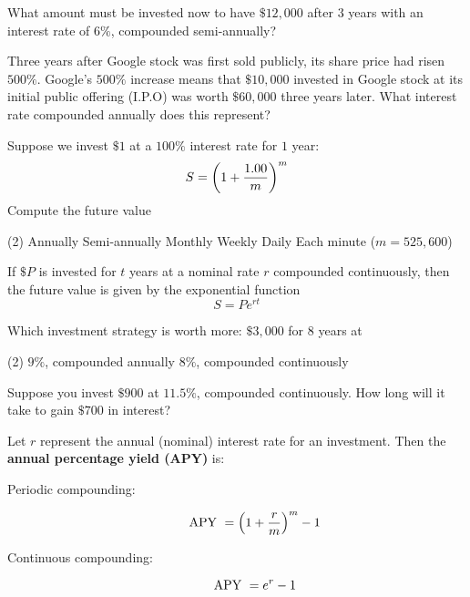 \documentclass[../mathNotesPreamble]{subfiles}
\begin{document}
  \begin{ex*}
    What amount must be invested now to have $\$12,000$ after $3$ years with an interest rate of $6\%$, compounded semi-annually?
  \end{ex*}
  
  \begin{ex*}
    Three years after Google stock was first sold publicly, its share price had risen $500\%$. Google’s $500\%$ increase means that $\$10,000$ invested in Google stock at its initial public offering (I.P.O) was worth $\$60,000$ three years later. What interest rate compounded annually does this represent?
  \end{ex*}
  \pagebreak
  
  \begin{ex*}
    Suppose we invest $\$1$ at a $100\%$ interest rate for $1$ year:
      \[S={\left(1+\frac{1.00}{m}\right)}^m\]
    Compute the future value 
  \end{ex*}
  \begin{extasks}[after-item-skip=\stretch{1}](2)
    \task Annually
    \task Semi-annually
    \task Monthly
    \task Weekly
    \task Daily
    \task Each minute ($m=525,600$)
  \end{extasks}
  \pagebreak
  
  \begin{defn*}
    If $\$P$ is invested for $t$ years at a nominal rate $r$ compounded continuously, then the future value is given by the exponential function
      \[S=Pe^{rt}\]
  \end{defn*}
  
  \begin{ex*}
    Which investment strategy is worth more: $\$3,000$ for $8$ years at
      \begin{extasks}[after-item-skip=\stretch{1}](2)
        \task $9\%$, compounded annually
        \task $8\%$, compounded continuously
      \end{extasks}
  \end{ex*}
  
  \begin{ex*}
    Suppose you invest $\$900$ at $11.5\%$, compounded continuously. How long will it take to gain $\$700$ in interest?
  \end{ex*}
  \pagebreak
  \begin{defn*}
    Let $r$ represent the annual (nominal) interest rate for an investment. Then the \textbf{annual percentage yield (APY)} is:
    \begin{description}
      \item[Periodic compounding:] 
        \[\textnormal{APY }={\left(1+\frac{r}{m}\right)}^m-1\]
      \item[Continuous compounding:]
        \[\textnormal{APY }=e^r-1\]
    \end{description}
  \end{defn*}

  \pagebreak
\end{document}
